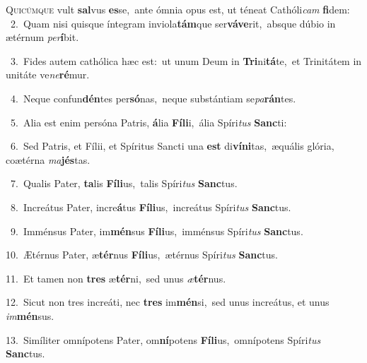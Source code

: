 \lettrine{\initial\textcolor{\initialcolor}{Q}}{uicúmque} vult \textbf{sal}\-vus \textbf{es}\-se,~\star ante ómnia opus est, ut téneat Cathóli\textit{cam} \textbf{fi}\-dem:\\
{\numbfont\textcolor{\numbcolor}{~2.}}~Quam nisi quisque íntegram inviola\-\textbf{tám}\-que ser\-\textbf{vá}\-\textbf{ve}rit,~\star absque dúbio in ætérnum \textit{per}\-\textbf{í}bit.\par
{\numbfont\textcolor{\numbcolor}{~3.}}~Fides autem cathólica hæc est:~\dagger ut unum Deum in \textbf{Tri}\-ni\-\textbf{tá}\-te,~\star et Trinitátem in unitáte ve\-\textit{ne}\-\textbf{ré}mur.\par
{\numbfont\textcolor{\numbcolor}{~4.}}~Neque confun\-\textbf{dén}\-tes per\-\textbf{só}\-nas,~\star neque substántiam se\-\textit{pa}\-\textbf{rán}tes.\par
{\numbfont\textcolor{\numbcolor}{~5.}}~Alia est enim persóna Patris, \textbf{á}\-lia \textbf{Fí}\-\textbf{li}i,~\star ália Spíri\textit{tus} \textbf{Sanc}\-ti:\par
{\numbfont\textcolor{\numbcolor}{~6.}}~Sed Patris, et Fílii, et Spíritus Sancti una \textbf{est} di\-\textbf{ví}\-\textbf{ni}tas,~\star æquális glória, coætérna \textit{ma}\-\textbf{jés}tas.\par
{\numbfont\textcolor{\numbcolor}{~7.}}~Qualis Pater, \textbf{ta}\-lis \textbf{Fí}\-\textbf{li}us,~\star talis Spíri\textit{tus} \textbf{Sanc}\-tus.\par
{\numbfont\textcolor{\numbcolor}{~8.}}~Increátus Pater, incre\-\textbf{á}\-tus \textbf{Fí}\-\textbf{li}us,~\star increátus Spíri\textit{tus} \textbf{Sanc}\-tus.\par
{\numbfont\textcolor{\numbcolor}{~9.}}~Imménsus Pater, im\-\textbf{mén}\-sus \textbf{Fí}\-\textbf{li}us,~\star imménsus Spíri\textit{tus} \textbf{Sanc}\-tus.\par
{\numbfont\textcolor{\numbcolor}{10.}}~Ætérnus Pater, æ\-\textbf{tér}\-nus \textbf{Fí}\-\textbf{li}us,~\star ætérnus Spíri\textit{tus} \textbf{Sanc}\-tus.\par
{\numbfont\textcolor{\numbcolor}{11.}}~Et tamen non \textbf{tres} æ\-\textbf{tér}\-ni,~\star sed unus \textit{æ}\-\textbf{tér}nus.\par
{\numbfont\textcolor{\numbcolor}{12.}}~Sicut non tres increáti, nec \textbf{tres} im\-\textbf{mén}\-si,~\star sed unus increátus, et unus \textit{im}\-\textbf{mén}sus.\par
{\numbfont\textcolor{\numbcolor}{13.}}~Simíliter omnípotens Pater, om\-\textbf{ní}\-potens \textbf{Fí}\-\textbf{li}us,~\star omnípotens Spíri\textit{tus} \textbf{Sanc}\-tus.\par
